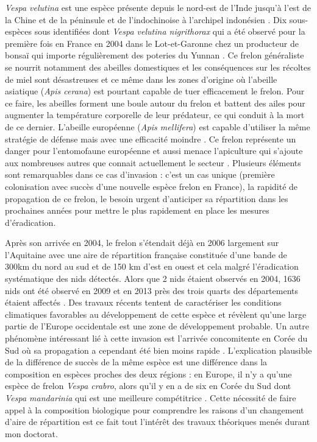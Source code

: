 \emph{Vespa velutina} est une espèce présente depuis le nord-est de
l'Inde jusqu'à l'est de la Chine et de la péninsule et de l'indochinoise
à l'archipel indonésien \citep{Villemant2006}. Dix sous-espèces sous
identifiées dont \emph{Vespa velutina nigrithorax} qui a été observé
pour la première fois en France en 2004 dans le Lot-et-Garonne chez un
producteur de bonsaï qui importe régulièrement des poteries du Yunnan
\citep{Villemant2006}. Ce frelon généraliste se nourrit notamment des
abeilles domestiques et les conséquences sur les récoltes de miel sont
désastreuses et ce même dans les zones d'origine où l'abeille asiatique
(\emph{Apis cerana}) est pourtant capable de tuer efficacement le
frelon. Pour ce faire, les abeilles forment une boule autour du frelon
et battent des ailes pour augmenter la température corporelle de leur
prédateur, ce qui conduit à la mort de ce dernier. L'abeille européenne
(\emph{Apis mellifera}) est capable d'utiliser la même stratégie de
défense mais avec une efficacité moindre \citep{Villemant2006}. Ce
frelon représente un danger pour l'entomofaune européenne et aussi
menace l'apiculture qui s'ajoute aux nombreuses autres que connait
actuellement le secteur \citep{Vanbergen2013}. Plusieurs éléments sont
remarquables dans ce cas d'invasion : c'est un cas unique (première
colonisation avec succès d'une nouvelle espèce frelon en France), la
rapidité de propagation de ce frelon, le besoin urgent d'anticiper sa
répartition dans les prochaines années pour mettre le plus rapidement en
place les mesures d'éradication.

Après son arrivée en 2004, le frelon s'étendait déjà en 2006 largement
sur l'Aquitaine avec une aire de répartition française constituée d'une
bande de 300km du nord au sud et de 150 km d'est en ouest
\citep{Villemant2006} et cela malgré l'éradication systématique des nids
détectés. Alors que 2 nids étaient observés en 2004, 1636 nids ont été
observé en 2009 et en 2013 près des trois quarts des départements
étaient affectés \citep{Robinet2016}. Des travaux récents tentent de
caractériser les conditions climatiques favorables au développement de
cette espèce \citep{Villemant2011} et révèlent qu'une large partie de
l'Europe occidentale est une zone de développement probable. Un autre
phénomène intéressant lié à cette invasion est l'arrivée concomitente en
Corée du Sud où sa propagation a cependant été bien moins rapide
\citep{Villemant2011}. L'explication plausible de la différence de
succès de la même espèce est une différence dans la composition en
espèces proches des deux régions : en Europe, il n'y a qu'une espèce de
frelon \emph{Vespa crabro}, alors qu'il y en a de six en Corée du Sud
dont \emph{Vespa mandarinia} qui est une meilleure compétitrice
\citep{Villemant2011}. Cette nécessité de faire appel à la composition
biologique pour comprendre les raisons d'un changement d'aire de
répartition est ce fait tout l'intérêt des travaux théoriques menés
durant mon doctorat.

